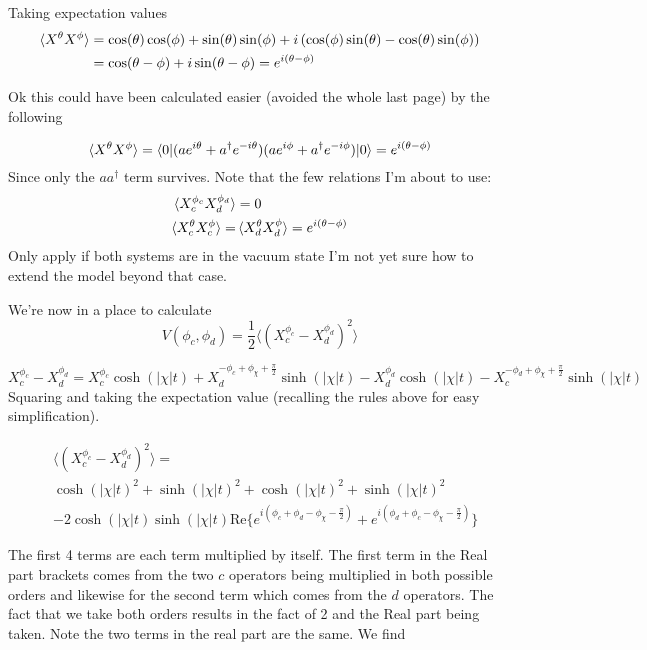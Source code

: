 \documentclass[12pt]{article}
\begin{document}
Taking expectation values
\begin{align*}
\braket{X^{\theta}X^{\phi}} &= \cos(\theta)\cos(\phi) + \sin(\theta)\sin(\phi) + i \left(\cos(\phi) \sin(\theta)-\cos(\theta)\sin(\phi)\right)\\
&= \cos(\theta-\phi) + i \sin(\theta-\phi) = e^{i(\theta-\phi)}
\end{align*}

Ok this could have been calculated easier (avoided the whole last page) by the following

\[
\braket{X^{\theta}X^{\phi}} = \braket{0|(a e^{i\theta} + a^{\dag} e^{-i \theta})(a e^{i \phi} + a^{\dag} e^{-i\phi})|0} = e^{i (\theta-\phi)}
\]
Since only the $a a^{\dag}$ term survives.
Note that the few relations I'm about to use:
\begin{align*}
\braket{X_c^{\phi_c}X_d^{\phi_d}} &= 0 \\
\braket{X_c^{\theta}X_c^{\phi}} = &\braket{X_d^{\theta}X_d^{\phi}} = e^{i(\theta-\phi)}
\end{align*}
Only apply if both systems are in the vacuum state I'm not yet sure how to extend the model beyond that case.

We're now in a place to calculate
\[
V(\phi_c,\phi_d) = \frac{1}{2}\langle (X_c^{\phi_c} - X_d^{\phi_d})^2 \rangle
\]

\begin{equation*}
X_c^{\phi_c} - X_d^{\phi_d} = X_c^{\phi_c}\cosh(|\chi|t) + X_d^{-\phi_c+\phi_{\chi}+\frac{\pi}{2}}\sinh(|\chi|t) - X_d^{\phi_d}\cosh(|\chi|t) - X_c^{-\phi_d+\phi_{\chi}+\frac{\pi}{2}}\sinh(|\chi|t)
\end{equation*}
Squaring and taking the expectation value (recalling the rules above for easy simplification).

\begin{align*}
&\langle (X_c^{\phi_c} - X_d^{\phi_d})^2 \rangle = \\
&\cosh(|\chi|t)^2 + \sinh(|\chi|t)^2 + \cosh(|\chi|t)^2 + \sinh(|\chi|t)^2 \\
&-2 \cosh(|\chi|t) \sinh(|\chi|t)\text{Re}\lbrace e^{i(\phi_c + \phi_d -\phi_{\chi} - \frac{\pi}{2})} + e^{i(\phi_d+\phi_c-\phi_{\chi}-\frac{\pi}{2})}\rbrace
\end{align*}

The first 4 terms are each term multiplied by itself. The first term in the Real part brackets comes from the two $c$ operators being multiplied in both possible orders and likewise for the second term which comes from the $d$ operators. The fact that we take both orders results in the fact of 2 and the Real part being taken. Note the two terms in the real part are the same. We find
\end{document}
